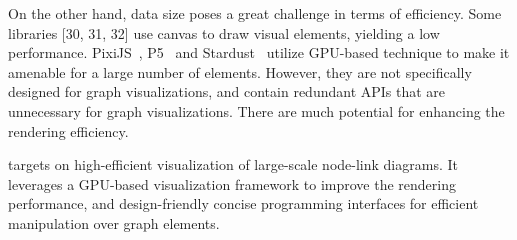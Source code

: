 On the other hand, data size poses a great challenge in terms of efficiency. Some libraries [30, 31, 32] use canvas to draw visual elements, yielding a low performance. PixiJS~\cite{graphicslearn}, P5~\cite{DBLP:journals/tvcg/LiM20} and Stardust~\cite{DBLP:journals/cgf/RenLH17} utilize GPU-based technique to make it amenable for a large number of elements. However, they are not specifically designed for graph visualizations, and contain redundant APIs that are unnecessary for graph visualizations. There are much potential for enhancing the rendering efficiency. 

\name targets on high-efficient visualization of large-scale node-link diagrams. It leverages a GPU-based visualization framework to improve the rendering performance, and design-friendly concise programming interfaces for efficient manipulation over graph elements.




